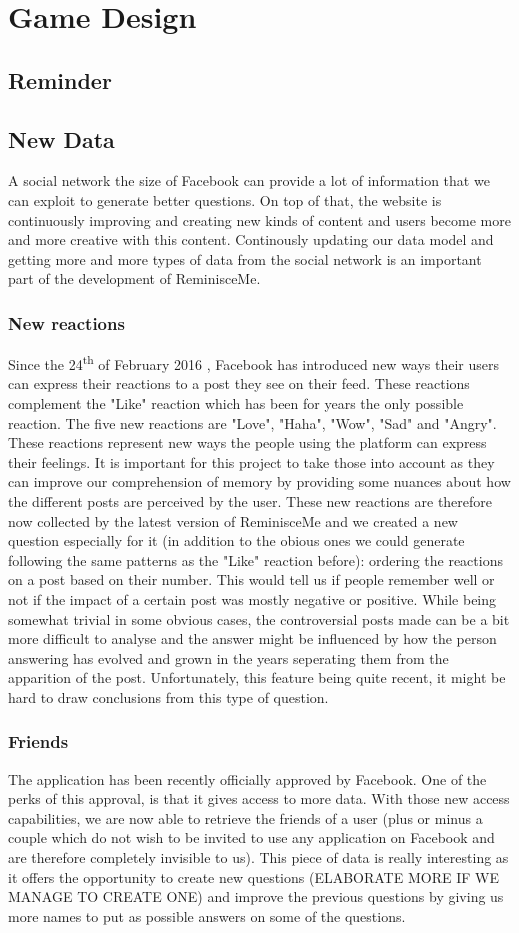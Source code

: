 \chapter{Game Design}
\section{Reminder}
\section{New Data}
A social network the size of Facebook can provide a lot of information that we can exploit to generate better questions. On top of that, the website is continuously improving and creating new kinds of content and users become more and more creative with this content. Continously updating our data model and getting more and more types of data from the social network is an important part of the development of ReminisceMe.
\subsection{New reactions}
Since the 24\textsuperscript{th} of February 2016 \cite{reactrelease}, Facebook has introduced new ways their users can express their reactions to a post they see on their feed. These reactions complement the "Like" reaction which has been for years the only possible reaction. The five new reactions are "Love", "Haha", "Wow", "Sad" and "Angry". These reactions represent new ways the people using the platform can express their feelings. It is important for this project to take those into account as they can improve our comprehension of memory by providing some nuances about how the different posts are perceived by the user. These new reactions are therefore now collected by the latest version of ReminisceMe and we created a new question especially for it (in addition to the obious ones we could generate following the same patterns as the "Like" reaction before): ordering the reactions on a post based on their number. This would tell us if people remember well or not if the impact of a certain post was mostly negative or positive. While being somewhat trivial in some obvious cases, the controversial posts made can be a bit more difficult to analyse and the answer might be influenced by how the person answering has evolved and grown in the years seperating them from the apparition of the post. Unfortunately, this feature being quite recent, it might be hard to draw conclusions from this type of question.
\subsection{Friends}
The application has been recently officially approved by Facebook. One of the perks of this approval, is that it gives access to more data. With those new access capabilities, we are now able to retrieve the friends of a user (plus or minus a couple which do not wish to be invited to use any application on Facebook and are therefore completely invisible to us). This piece of data is really interesting as it offers the opportunity to create new questions (ELABORATE MORE IF WE MANAGE TO CREATE ONE) and improve the previous questions by giving us more names to put as possible answers on some of the questions.